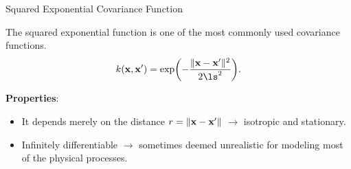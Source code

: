 \documentclass[11pt,compress,t,notes=noshow, xcolor=table]{beamer}
\begin{document}





\begin{vbframe}{Squared Exponential Covariance Function}

The squared exponential function is one of the most commonly used covariance functions.
$$
k(\xv, \xv^\prime) = \exp\biggl(- \frac{\|\xv - \xv^\prime\|^2}{2\ls^2}\biggr).
$$

\textbf{Properties}:
\begin{itemize}
\item It depends merely on the distance $r = \|\mathbf{x} - \mathbf{x}^\prime\|$ $\to$ isotropic and stationary.\lz
\item Infinitely differentiable $\to$ sometimes deemed 
  unrealistic for modeling most of the physical processes.

\end{itemize}

\end{vbframe}
\end{document}
